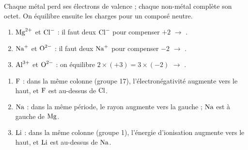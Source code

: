 \documentclass[11pt,a4paper]{article}
\begin{document}
\begin{corrige}
Chaque métal perd ses électrons de valence ; chaque non-métal complète son octet. On équilibre ensuite
les charges pour un composé neutre.
\begin{enumerate}[label=\alph*)]
  \item $\ce{Mg^{2+}}$ et $\ce{Cl^{-}}$ : il faut deux $\ce{Cl^{-}}$ pour compenser $+2$ $\to$ .
  \item $\ce{Na^{+}}$ et $\ce{O^{2-}}$ : il faut deux $\ce{Na^{+}}$ pour compenser $-2$ $\to$ .
  \item $\ce{Al^{3+}}$ et $\ce{O^{2-}}$ : on équilibre $2\times(+3) = 3\times(-2)$ $\to$ .
\end{enumerate}
\end{corrige}

\begin{corrige}
\begin{enumerate}[label=\alph*)]
  \item \textbf{$\ce{F}$} : dans la même colonne (groupe 17), l'électronégativité augmente vers le haut,
        et $\ce{F}$ est au-dessus de $\ce{Cl}$.
  \item \textbf{$\ce{Na}$} : dans la même période, le rayon augmente vers la gauche ; $\ce{Na}$ est à
        gauche de $\ce{Mg}$.
  \item \textbf{$\ce{Li}$} : dans la même colonne (groupe 1), l'énergie d'ionisation augmente vers le
        haut, et $\ce{Li}$ est au-dessus de $\ce{Na}$.
\end{enumerate}
\end{corrige}
\end{document}
